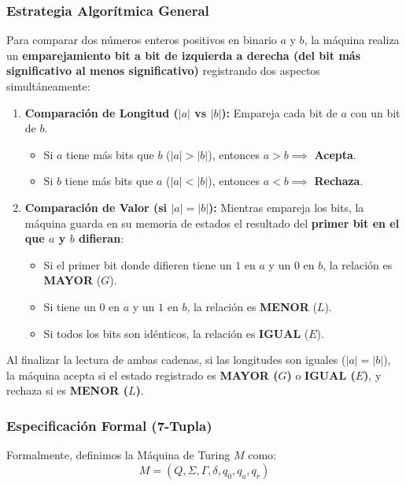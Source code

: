 \subsubsection*{Estrategia Algorítmica General}

Para comparar dos números enteros positivos en binario $a$ y $b$, la máquina realiza un \textbf{emparejamiento bit a bit de izquierda a derecha (del bit más significativo al menos significativo)} registrando dos aspectos simultáneamente:
\begin{enumerate}[label=\arabic*., leftmargin=*]
    \item \textbf{Comparación de Longitud ($|a|$ vs $|b|$):} Empareja cada bit de $a$ con un bit de $b$. 
    \begin{itemize}[leftmargin=*]
        \item Si $a$ tiene más bits que $b$ ($|a| > |b|$), entonces $a > b \implies$ \textbf{Acepta}.
        \item Si $b$ tiene más bits que $a$ ($|a| < |b|$), entonces $a < b \implies$ \textbf{Rechaza}.
    \end{itemize}
    \item \textbf{Comparación de Valor (si $|a| = |b|$):} Mientras empareja los bits, la máquina guarda en su memoria de estados el resultado del \textbf{primer bit en el que $a$ y $b$ difieran}:
    \begin{itemize}[leftmargin=*]
        \item Si el primer bit donde difieren tiene un $1$ en $a$ y un $0$ en $b$, la relación es \textbf{MAYOR} ($G$).
        \item Si tiene un $0$ en $a$ y un $1$ en $b$, la relación es \textbf{MENOR} ($L$).
        \item Si todos los bits son idénticos, la relación es \textbf{IGUAL} ($E$).
    \end{itemize}
\end{enumerate}

Al finalizar la lectura de ambas cadenas, si las longitudes son iguales ($|a| = |b|$), la máquina acepta si el estado registrado es \textbf{MAYOR ($G$)} o \textbf{IGUAL ($E$)}, y rechaza si es \textbf{MENOR ($L$)}.

\subsubsection*{Especificación Formal (7-Tupla)}

Formalmente, definimos la Máquina de Turing $M$ como:
\[ M = (Q, \Sigma, \Gamma, \delta, q_0, q_a, q_r) \]

